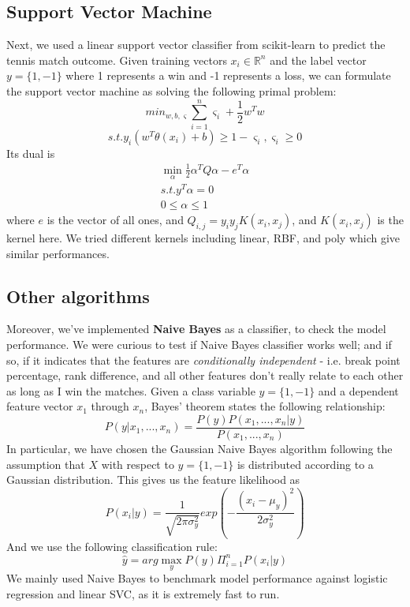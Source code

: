 \documentclass[paper=a4, fontsize=10pt]{scrartcl} %
\numberwithin{equation}{section} %
\numberwithin{figure}{section} %
\numberwithin{table}{section} %
\begin{document}
\subsection{Support Vector Machine}
Next, we used a linear support vector classifier from scikit-learn \cite{scikit-learn} to predict the tennis match outcome. Given training vectors $x_i \in \mathbb{R}^n$ and the label vector $y = \{1,-1\}$ where 1 represents a win and -1 represents a loss, we can formulate the support vector machine as solving the following primal problem: $$min_{w,b, \varsigma} \sum_{i=1}^n \varsigma_i + \frac{1}{2}w^Tw$$ 
$$s.t. y_i(w^T\theta(x_i) + b) \geq 1 - \varsigma_i,    \varsigma_i \geq 0$$
Its dual is \begin{align*}
\min_\alpha \frac{1}{2}\alpha^TQ\alpha - e^T\alpha \\
s.t. y^T \alpha = 0 \\
0 \le \alpha \le 1 
\end{align*}
where $e$ is the vector of all ones, and $Q_{i,j} = y_i y_j K(x_i, x_j)$, and $K(x_i, x_j)$ is the kernel here. We tried different kernels including linear, RBF, and poly which give similar performances. 
\subsection{Other algorithms}
Moreover, we've implemented \textbf{Naive Bayes} as a classifier, to check the model performance. We were curious to test if Naive Bayes classifier works well; and if so, if it indicates that the features are \textit{conditionally independent} - i.e. break point percentage, rank difference, and all other features don't really relate to each other as long as I win the matches. Given a class variable $y = \{1,-1\}$  and a dependent feature vector $x_1$ through $x_n$, Bayes’ theorem states the following relationship: $$P(y|x_1,...,x_n) = \frac{P(y)P(x_1,...,x_n|y)}{P(x_1,...,x_n)}$$
In particular, we have chosen the Gaussian Naive Bayes algorithm following the assumption that $X$ with respect to $y = \{1,-1\}$ is distributed according to a Gaussian distribution. This gives us the feature likelihood as $$P(x_i | y) = \frac{1}{\sqrt{2\pi \sigma_y^2}} exp(-\frac{(x_i - \mu_y)^2}{2\sigma_y^2})$$
And we use the following classification rule:
$$\hat{y} = arg \max_y P(y) \Pi_{i=1}^n P(x_i | y)$$
We mainly used Naive Bayes to benchmark model performance against logistic regression and linear SVC, as it is extremely fast to run.
\end{document}
